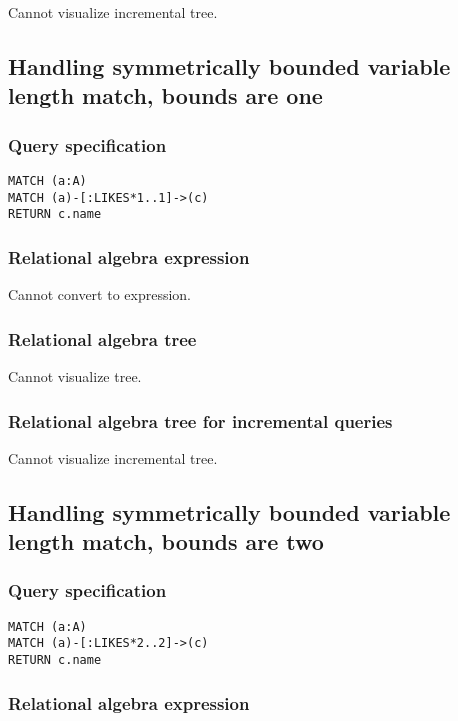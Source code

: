 Cannot visualize incremental tree.

\subsection{Handling symmetrically bounded variable length match, bounds are one}

\subsubsection*{Query specification}

\begin{lstlisting}
MATCH (a:A)
MATCH (a)-[:LIKES*1..1]->(c)
RETURN c.name
\end{lstlisting}

\subsubsection*{Relational algebra expression}

Cannot convert to expression.

\subsubsection*{Relational algebra tree}

Cannot visualize tree.

\subsubsection*{Relational algebra tree for incremental queries}

Cannot visualize incremental tree.

\subsection{Handling symmetrically bounded variable length match, bounds are two}

\subsubsection*{Query specification}

\begin{lstlisting}
MATCH (a:A)
MATCH (a)-[:LIKES*2..2]->(c)
RETURN c.name
\end{lstlisting}

\subsubsection*{Relational algebra expression}

